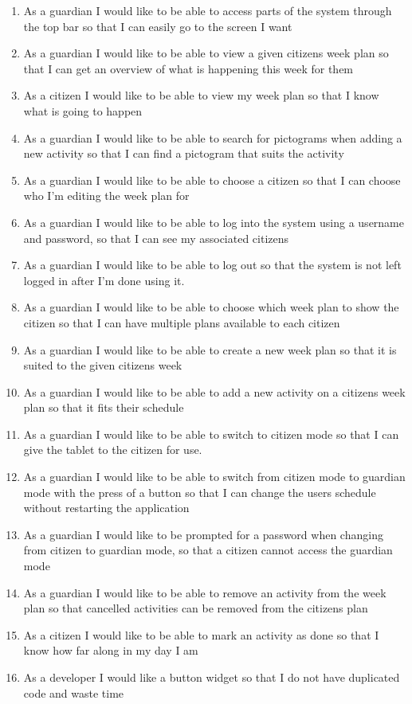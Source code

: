\begin{enumerate}
    \item As a guardian I would like to be able to access parts of the system through the top bar so that I can easily go to the screen I want
    \item As a guardian I would like to be able to view a given citizens week plan so that I can get an overview of what is happening this week for them
    \item As a citizen I would like to be able to view my week plan so that I know what is going to happen
    \item As a guardian I would like to be able to search for pictograms when adding a new activity so that I can find a pictogram that suits the activity
    \item As a guardian I would like to be able to choose a citizen so that I can choose who I’m editing the week plan for
    \item As a guardian I would like to be able to log into the system using a username and password, so that I can see my associated citizens
    \item As a guardian I would like to be able to log out so that the system is not left logged in after I’m done using it. 
    \item As a guardian I would like to be able to choose which week plan to show the citizen so that I can have multiple plans available to each citizen
    \item As a guardian I would like to be able to create a new week plan so that it is suited to the given citizens week 
    \item As a guardian I would like to be able to add a new activity on a citizens week plan so that it fits their schedule
    \item As a guardian I would like to be able to switch to citizen mode so that I can give the tablet to the citizen for use.
    \item As a guardian I would like to be able to switch from citizen mode to guardian mode with the press of a button so that I can change the users schedule without restarting the application
    \item As a guardian I would like to be prompted for a password when changing from citizen to guardian mode, so that a citizen cannot access the guardian mode
    \item As a guardian I would like to be able to remove an activity from the week plan so that cancelled activities can be removed from the citizens plan
    \item As a citizen I would like to be able to mark an activity as done so that I know how far along in my day I am
    \item As a developer I would like a button widget so that I do not have duplicated code and waste time
\end{enumerate}


